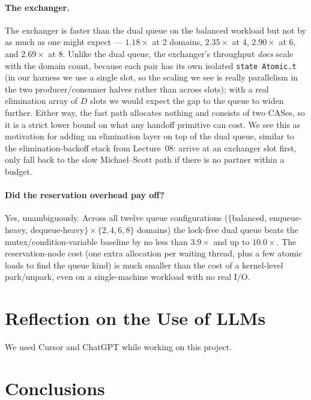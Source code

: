 \documentclass[11pt,a4paper]{article}
\begin{document}
\paragraph{The exchanger.}
The exchanger is faster than the dual queue on the balanced
workload but not by as much as one might expect ---
$1.18\times$ at 2 domains, $2.35\times$ at 4, $2.90\times$ at 6,
and $2.69\times$ at 8. Unlike the dual queue, the exchanger's
throughput \emph{does} scale with the domain count, because each
pair has its own isolated \texttt{state Atomic.t} (in our harness
we use a single slot, so the scaling we see is really
parallelism in the two producer/consumer halves rather than
across slots); with a real elimination array of $D$ slots we
would expect the gap to the queue to widen further. Either way,
the fast path allocates nothing and consists of two CASes, so it
is a strict lower bound on what any handoff primitive can cost.
We see this as motivation for adding an elimination layer on top
of the dual queue, similar to the elimination-backoff stack from
Lecture~08: arrive at an exchanger slot first, only fall back to
the slow Michael--Scott path if there is no partner within a
budget.

\paragraph{Did the reservation overhead pay off?}
Yes, unambiguously. Across all twelve queue configurations
($\{$balanced, enqueue-heavy, dequeue-heavy$\} \times \{2,4,6,8\}$
domains) the lock-free dual queue beats the mutex/condition-variable
baseline by no less than $3.9\times$ and up to $10.0\times$. The
reservation-node cost (one extra allocation per waiting thread, plus
a few atomic loads to find the queue kind) is much smaller than the
cost of a kernel-level park/unpark, even on a single-machine
workload with no real I/O.

\section{Reflection on the Use of LLMs}
\label{sec:llm}

We used Cursor and ChatGPT while working on this project.

\section{Conclusions}
\label{sec:conclusions}
\end{document}
